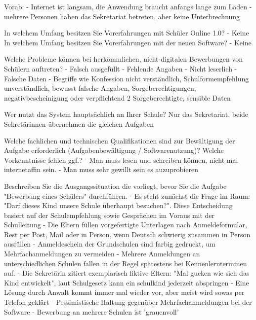 Vorab: 	
- Internet ist langsam, die Anwendung braucht anfangs lange zum Laden
- mehrere Personen haben das Sekretariat betreten, aber keine Unterbrechnung
 
In welchem Umfang besitzen Sie Vorerfahrungen mit Schüler Online 1.0? 	
- Keine				
In welchem Umfang besitzen Sie Vorerfahrungen mit der neuen Software?	
- Keine







Welche Probleme können bei herkömmlichen, nicht-digitalen Bewerbungen von Schülern auftreten?
- Falsch ausgefüllt
- Fehlende Angaben
- Nicht leserlich
- Falsche Daten
- Begriffe wie Konfession nicht verständlich, Schulformempfehlung unverständlich, bewusst falsche Angaben, Sorgeberechtigungen, negativbescheinigung oder verpflichtend 2 Sorgeberechtigte, sensible Daten




Wer nutzt das System hauptsächlich an Ihrer Schule?
Nur das Sekretariat, beide Sekretärinnen übernehmen die gleichen Aufgaben










Welche fachlichen und technischen Qualifikationen sind zur Bewältigung der Aufgabe erforderlich (Aufgabenbewältigung / Softwarenutzung)? Welche Vorkenntnisse fehlen ggf.?	
- Man muss lesen und schreiben können, nicht mal internetaffin sein.
- Man muss sehr gewillt sein es auzuprobieren		










Beschreiben Sie die Ausgangssituation die vorliegt, bevor Sie die Aufgabe "Bewerbung eines Schülers" durchführen.	
- Es steht zunächst die Frage im Raum: "Darf dieses Kind unsere Schule überhaupt besuchen?". Diese Entscheidung basiert auf der Schulempfehlung sowie Gesprächen im Voraus mit der Schulleitung
- Die Eltern füllen vorgefertigte Unterlagen nach Anmeldeformular, Rest per Post, Mail oder in Person, wenn Deutsch schwierig zusammen in Person ausfüllen	
- Anmeldeschein der Grundschulen sind farbig gedruckt, um Mehrfachanmeldungen zu vermeiden
- Mehrere Anmeldungen an unterschiedlichen Schulen fallen in der Regel spätestens bei Kennenlernterminen auf. 
 - Die Sekretärin zitiert exemplarisch fiktive Eltern: "Mal gucken wie sich das Kind entwickelt", laut Schulgesetz kann ein schulkind jederzeit abspringen	
- Eine Lösung durch Anwalt kommt immer mal wieder vor, aber meist wird sowas per Telefon geklärt
- Pessimistische Haltung gegenüber Mehrfachanmeldungen bei der Software
- Bewerbung an mehrere Schulen ist 'grauenvoll'



